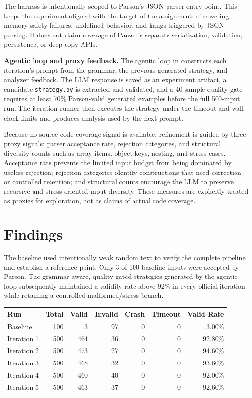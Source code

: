 \documentclass[10pt,a4paper]{article}
\begin{document}
The harness is intentionally scoped to Parson's JSON parser entry point. This keeps the experiment aligned with the target of the
assignment: discovering memory-safety failures, undefined behavior, and hangs triggered by JSON parsing. It does not claim coverage of
Parson's separate serialization, validation, persistence, or deep-copy APIs.

\textbf{Agentic loop and proxy feedback.}
The agentic loop in  constructs each iteration's prompt from the grammar, the previous generated
strategy, and analyzer feedback. The LLM response is saved as an experiment artifact, a candidate \texttt{strategy.py} is extracted and
validated, and a 40-sample quality gate requires at least 70\% Parson-valid generated examples before the full 500-input run. The
iteration runner then executes the strategy under the timeout and wall-clock limits and produces analysis used by the next prompt.

Because no source-code coverage signal is available, refinement is guided by three proxy signals: parser acceptance rate, rejection
categories, and structural diversity counts such as array items, object keys, nesting, and stress cases. Acceptance rate prevents the
limited input budget from being dominated by useless rejection; rejection categories identify constructions that need correction or
controlled retention; and structural counts encourage the LLM to preserve recursive and stress-oriented input diversity. These measures
are explicitly treated as proxies for exploration, not as claims of actual code coverage.

\section{Findings}

The baseline used intentionally weak random text to verify the complete pipeline and establish a reference point. Only 3 of 100 baseline
inputs were accepted by Parson. The grammar-aware, quality-gated strategies generated by the agentic loop subsequently maintained a
validity rate above 92\% in every official iteration while retaining a controlled malformed/stress branch.

\begin{center}
\small
\renewcommand{\arraystretch}{1.05}
\begin{tabular}{lrrrrrr}
\toprule
\textbf{Run} & \textbf{Total} & \textbf{Valid} & \textbf{Invalid} &
\textbf{Crash} & \textbf{Timeout} & \textbf{Valid Rate}\\
\midrule
Baseline     & 100 & 3   & 97 & 0 & 0 & 3.00\%\\
Iteration 1  & 500 & 464 & 36 & 0 & 0 & 92.80\%\\
Iteration 2  & 500 & 473 & 27 & 0 & 0 & 94.60\%\\
Iteration 3  & 500 & 468 & 32 & 0 & 0 & 93.60\%\\
Iteration 4  & 500 & 460 & 40 & 0 & 0 & 92.00\%\\
Iteration 5  & 500 & 463 & 37 & 0 & 0 & 92.60\%\\
\bottomrule
\end{tabular}
\end{center}
\end{document}
